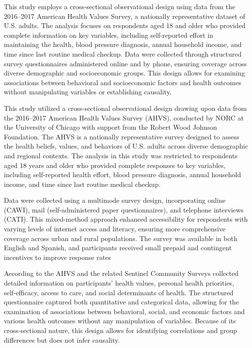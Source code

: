 \documentclass[
  letterpaper,
  DIV=11,
  numbers=noendperiod]{scrartcl}
\begin{document}
This study employs a cross-sectional observational design using data
from the 2016--2017 American Health Values Survey, a nationally
representative dataset of U.S. adults. The analysis focuses on
respondents aged 18 and older who provided complete information on key
variables, including self-reported effort in maintaining the health,
blood pressure diagnosis, annual household income, and time since last
routine medical checkup. Data were collected through structured survey
questionnaires administered online and by phone, ensuring coverage
across diverse demographic and socioeconomic groups. This design allows
for examining associations between behavioral and socioeconomic factors
and health outcomes without manipulating variables or establishing
causality.

This study utilized a cross-sectional observational design drawing upon
data from the 2016--2017 American Health Values Survey (AHVS), conducted
by NORC at the University of Chicago with support from the Robert Wood
Johnson Foundation. The AHVS is a nationally representative survey
designed to assess the health beliefs, values, and behaviors of U.S.
adults across diverse demographic and regional contexts. The analysis in
this study was restricted to respondents aged 18 years and older who
provided complete responses to key variables, including self-reported
health effort, blood pressure diagnosis, annual household income, and
time since last routine medical checkup.

Data were collected using a multimode survey design, incorporating
online (CAWI), mail (self-administered paper questionnaires), and
telephone interviews (CATI). This mixed-method approach enhanced
accessibility for respondents with varying levels of internet access and
literacy, ensuring more comprehensive coverage across urban and rural
populations. The survey was available in both English and Spanish, and
participants received small prepaid and contingent incentives to improve
response rates

According to the AHVS and the related Sentinel Community Surveys
collected detailed information on participants' health values, personal
health priorities, self-efficacy, access to care, and social
determinants of health. The structured questionnaire captured both
quantitative and categorical data, allowing for the examination of
associations between behavioral, social, and economic factors and
various health outcomes without any manipulation of variables. Because
of its cross-sectional nature, this design allows for identifying
correlations and group differences but does not infer causality.
\end{document}
